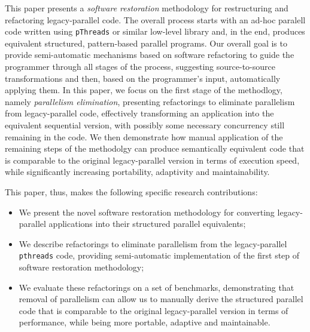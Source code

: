 This paper presents a \emph{software restoration} methodology for restructuring and refactoring legacy-parallel code. The overall process starts with an ad-hoc paralell code written using \lstinline{pThreads} or similar low-level library and, in the end, produces equivalent structured, pattern-based parallel programs. Our overall goal is to provide semi-automatic mechanisms based on software refactoring to guide the programmer through all stages of the process, suggesting source-to-source transformations and then, based on the programmer's input, automatically applying them. In this paper, we focus on the first stage of the methodlogy, namely \emph{parallelism elimination}, presenting refactorings to eliminate parallelism from legacy-parallel code, effectively transforming an application into the equivalent sequential version, with possibly some necessary concurrency still remaining in the code. We then demonstrate how manual application of the remaining steps of the methodolgy can produce semantically equivalent code that is comparable to the original legacy-parallel version in terms of execution speed, while significantly increasing portability, adaptivity and maintainability.

This paper, thus, makes the following specific research contributions:
\begin{itemize}
    \item We present the novel software restoration methodology for converting legacy-parallel applications into their structured parallel equivalents;
    \item We describe refactorings to eliminate parallelism from the legacy-parallel \lstinline{pthreads} code, providing semi-automatic implementation of the first step of software restoration methodology;
    \item We evaluate these refactorings on a set of benchmarks, demonstrating that removal of parallelism can allow us to manually derive the structured parallel code that is comparable to the original legacy-parallel version in terms of performance, while being more portable, adaptive and maintainable.
\end{itemize}

